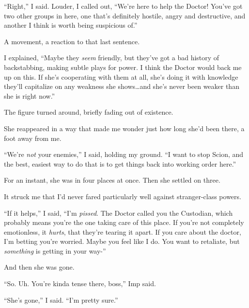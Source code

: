 ``Right,'' I said.  Louder, I called out, ``We're here to help the Doctor!  You've got two other groups in here, one that's definitely hostile, angry and destructive, and another I think is worth being suspicious of.''



A movement, a reaction to that last sentence.



I explained, ``Maybe they \emph{seem} friendly, but they've got a bad history of backstabbing, making subtle plays for power.  I think the Doctor would back me up on this.  If she's cooperating with them at all, she's doing it with knowledge they'll capitalize on any weakness she shows\ldots and she's never been weaker than she is right now.''



The figure turned around, briefly fading out of existence.



She reappeared in a way that made me wonder just how long she'd been there, a foot away from me.



``We're \emph{not} your enemies,'' I said, holding my ground.  ``I want to stop Scion, and the best, easiest way to do that is to get things back into working order here.''



For an instant, she was in four places at once.  Then she settled on three.



It struck me that I'd never fared particularly well against stranger-class powers.



``If it helps,'' I said, ``I'm \emph{pissed}.  The Doctor called you the Custodian, which probably means you're the one taking care of this place.  If you're not completely emotionless, it \emph{hurts}, that they're tearing it apart.  If you care about the doctor, I'm betting you're worried.  Maybe you feel like I do.  You want to retaliate, but \emph{something} is getting in your way-''



And then she was gone.



``So.  Uh.  You're kinda tense there, boss,'' Imp said.



``She's gone,'' I said.  ``I'm pretty sure.''



